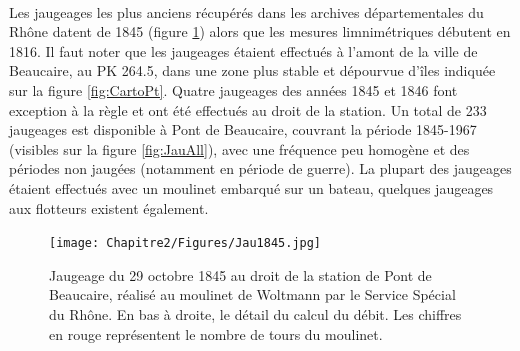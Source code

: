     
	\begin{table}[h]
	\centering
	\caption{Détail des relevés limnimétriques des stations de Beaucaire}
    \label{tab:MesuresPtBcr}
       \end{table}       
       
   
       
    \paragraph{} Les jaugeages les plus anciens récupérés dans les archives départementales du Rhône datent de 1845 (figure \ref{fig:Jau1845}) alors que les mesures limnimétriques débutent en 1816. Il faut noter que les jaugeages étaient effectués à l'amont de la ville de Beaucaire, au PK 264.5, dans une zone plus stable et dépourvue d'îles indiquée sur la figure \ref{fig:CartoPt}. Quatre jaugeages des années 1845 et 1846 font exception à la règle et ont été effectués au droit de la station. Un total de 233 jaugeages est disponible à Pont de Beaucaire, couvrant la période 1845-1967 (visibles sur la figure \ref{fig:JauAll}), avec une fréquence peu homogène et des périodes non jaugées (notamment en période de guerre). La plupart des jaugeages étaient effectués avec un moulinet embarqué sur un bateau, quelques jaugeages aux flotteurs existent également. 
    
    \begin{figure}[h]
	\centering
		\texttt{[image: Chapitre2/Figures/Jau1845.jpg]}
        \caption{Jaugeage du 29 octobre 1845 au droit de la station de Pont de Beaucaire, réalisé au moulinet de Woltmann par le Service Spécial du Rhône. En bas à droite, le détail du calcul du débit. Les chiffres en rouge représentent le nombre de tours du moulinet.}	
		\label{fig:Jau1845}
	\end{figure}
    	
